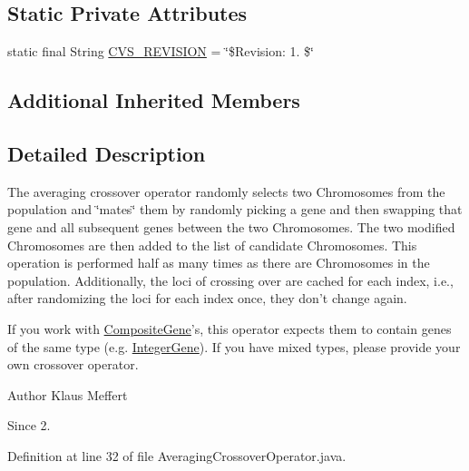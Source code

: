 \subsection*{Static Private Attributes}
\begin{DoxyCompactItemize}
\item 
static final String \hyperlink{classorg_1_1jgap_1_1impl_1_1_averaging_crossover_operator_abe86441786d8a0e6133096021230594c}{C\-V\-S\-\_\-\-R\-E\-V\-I\-S\-I\-O\-N} = \char`\"{}\$Revision\-: 1. \$\char`\"{}
\end{DoxyCompactItemize}
\subsection*{Additional Inherited Members}


\subsection{Detailed Description}
The averaging crossover operator randomly selects two Chromosomes from the population and \char`\"{}mates\char`\"{} them by randomly picking a gene and then swapping that gene and all subsequent genes between the two Chromosomes. The two modified Chromosomes are then added to the list of candidate Chromosomes. This operation is performed half as many times as there are Chromosomes in the population. Additionally, the loci of crossing over are cached for each index, i.\-e., after randomizing the loci for each index once, they don't change again.

If you work with \hyperlink{classorg_1_1jgap_1_1impl_1_1_composite_gene}{Composite\-Gene}'s, this operator expects them to contain genes of the same type (e.\-g. \hyperlink{classorg_1_1jgap_1_1impl_1_1_integer_gene}{Integer\-Gene}). If you have mixed types, please provide your own crossover operator.

\begin{DoxyAuthor}{Author}
Klaus Meffert 
\end{DoxyAuthor}
\begin{DoxySince}{Since}
2. 
\end{DoxySince}


Definition at line 32 of file Averaging\-Crossover\-Operator.\-java.



